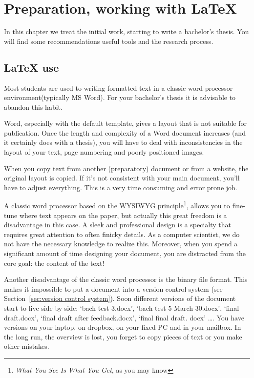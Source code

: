\chapter{Preparation, working with \LaTeX{}}
\label{ch:preparation}

In this chapter we treat the initial work, starting to write a bachelor's thesis. You will find some recommendations useful tools and the research process.

\section{{\LaTeX} use}
\label{sec:latex-use}

Most students are used to writing formatted text in a classic word processor environment(typically MS Word). For your bachelor's thesis it is advisable to abandon this habit.

Word, especially with the default template, gives a layout that is not suitable for publication. Once the length and complexity of a Word document increases (and it certainly does with a thesis), you will have to deal with inconsistencies in the layout of your text, page numbering and poorly positioned images.

When you copy text from another (preparatory) document or from a website, the original layout is copied. If it's not consistent with your main document, you'll have to adjust everything. This is a very time consuming and error prone job.

A classic word processor based on the WYSIWYG principle\footnote{\emph{What You See Is What You Get}, as you may know}, allows you to fine-tune where text appears on the paper, but actually this great freedom is a disadvantage in this case. A sleek and professional design is a specialty that requires great attention to often finicky details. As a computer scientist, we do not have the necessary knowledge to realize this. Moreover, when you spend a significant amount of time designing your document, you are distracted from the core goal: the content of the text!

Another disadvantage of the classic word processor is the binary file format. This makes it impossible to put a document into a version control system (see Section~\ref{sec:version control system}). Soon different versions of the document start to live side by side: `bach ​​test 3.docx', `bach ​​test 5 March 30.docx', `final draft.docx', `final draft after feedback.docx', `final final draft. docx' \dots. You have versions on your laptop, on dropbox, on your fixed PC and in your mailbox. In the long run, the overview is lost, you forget to copy pieces of text or you make other mistakes.

